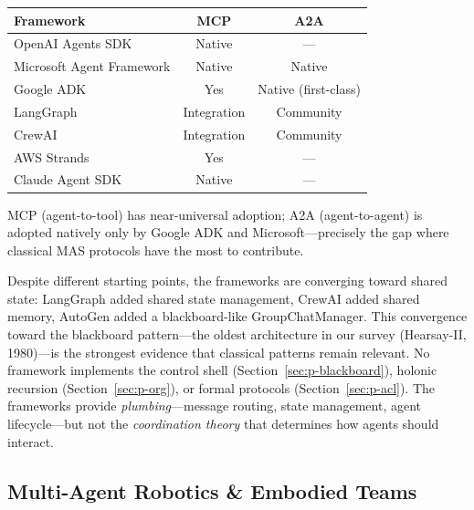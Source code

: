 \documentclass{article}
\begin{document}
\begin{center}
\small
\begin{tabular}{@{} l c c @{}}
\toprule
\textbf{Framework} & \textbf{MCP} & \textbf{A2A} \\
\midrule
OpenAI Agents SDK & Native & --- \\
Microsoft Agent Framework & Native & Native \\
Google ADK & Yes & Native (first-class) \\
LangGraph & Integration & Community \\
CrewAI & Integration & Community \\
AWS Strands & Yes & --- \\
Claude Agent SDK & Native & --- \\
\bottomrule
\end{tabular}
\end{center}

\noindent
MCP (agent-to-tool) has near-universal adoption; A2A (agent-to-agent) is adopted
natively only by Google ADK and Microsoft---precisely the gap where classical MAS
protocols have the most to contribute.

Despite different starting points, the frameworks are converging toward shared state:
LangGraph added shared state management, CrewAI added shared memory, AutoGen added a
blackboard-like GroupChatManager. This convergence toward the blackboard pattern---the
oldest architecture in our survey (Hearsay-II, 1980)---is the strongest evidence that
classical patterns remain relevant. No framework implements the control shell
(Section~\ref{sec:p-blackboard}), holonic recursion (Section~\ref{sec:p-org}), or
formal protocols (Section~\ref{sec:p-acl}). The frameworks provide
\emph{plumbing}---message routing, state management, agent lifecycle---but not the
\emph{coordination theory} that determines how agents should interact.

\subsection{Multi-Agent Robotics \& Embodied Teams}
\label{sec:p-swarm}

%
%
%
\end{document}
